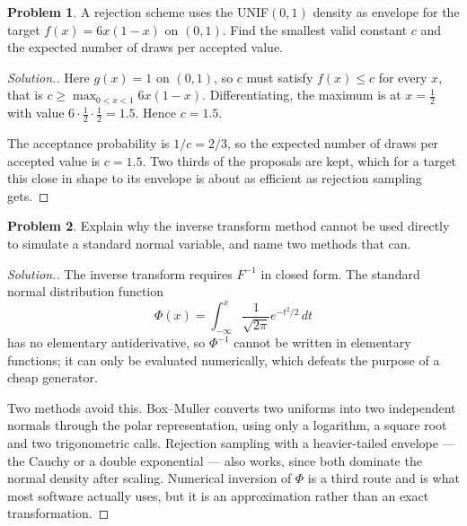 \documentclass[11pt,a4paper]{article}
\theoremstyle{definition}
\newtheorem{problemx}{Problem}[subsection]
\newenvironment{problem}{\begin{problemx}}{\end{problemx}}
\newenvironment{solution}
  {\renewcommand{\qedsymbol}{}\begin{proof}[\textit{Solution}.]}
  {\end{proof}}
\begin{document}
\begin{problem}
A rejection scheme uses the UNIF$(0,1)$ density as envelope for the target
$f(x) = 6x(1-x)$ on $(0,1)$. Find the smallest valid constant $c$ and the
expected number of draws per accepted value.
\end{problem}
\begin{solution}
Here $g(x)=1$ on $(0,1)$, so $c$ must satisfy $f(x)\leq c$ for every $x$, that is
$c \geq \max_{0<x<1} 6x(1-x)$. Differentiating, the maximum is at $x=\tfrac12$
with value $6\cdot\tfrac12\cdot\tfrac12 = 1.5$. Hence $c = 1.5$.

The acceptance probability is $1/c = 2/3$, so the expected number of draws per
accepted value is $c = 1.5$. Two thirds of the proposals are kept, which for a
target this close in shape to its envelope is about as efficient as rejection
sampling gets.
\end{solution}

\begin{problem}
Explain why the inverse transform method cannot be used directly to simulate a
standard normal variable, and name two methods that can.
\end{problem}
\begin{solution}
The inverse transform requires $F^{-1}$ in closed form. The standard normal
distribution function
$$\Phi(x) = \int_{-\infty}^{x}\frac{1}{\sqrt{2\pi}}e^{-t^{2}/2}\,dt$$
has no elementary antiderivative, so $\Phi^{-1}$ cannot be written in
elementary functions; it can only be evaluated numerically, which defeats the
purpose of a cheap generator.

Two methods avoid this. Box--Muller converts two uniforms into two independent
normals through the polar representation, using only a logarithm, a square root
and two trigonometric calls. Rejection sampling with a heavier-tailed envelope
--- the Cauchy or a double exponential --- also works, since both dominate the
normal density after scaling. Numerical inversion of $\Phi$ is a third route and
is what most software actually uses, but it is an approximation rather than an
exact transformation.
\end{solution}
\end{document}
